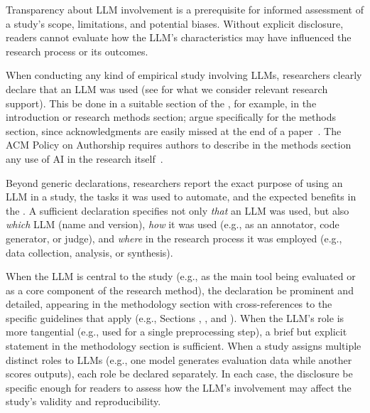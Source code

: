 
Transparency about LLM involvement is a prerequisite for informed assessment of a study's scope, limitations, and potential biases.
Without explicit disclosure, readers cannot evaluate how the LLM's characteristics may have influenced the research process or its outcomes.


When conducting any kind of empirical study involving LLMs, researchers \must clearly declare that an LLM was used (see \scope for what we consider relevant research support).
This \should be done in a suitable section of the \paper, for example, in the introduction or research methods section; \citeauthor{cheng2025writing} argue specifically for the methods section, since acknowledgments are easily missed at the end of a paper~\cite{cheng2025writing}.
The ACM Policy on Authorship requires authors to describe in the methods section any use of AI in the research itself~\cite{ACM2026}.

Beyond generic declarations, researchers \should report the exact purpose of using an LLM in a study, the tasks it was used to automate, and the expected benefits in the \paper.
A sufficient declaration specifies not only \emph{that} an LLM was used, but also \emph{which} LLM (name and version), \emph{how} it was used (e.g., as an annotator, code generator, or judge), and \emph{where} in the research process it was employed (e.g., data collection, analysis, or synthesis).

When the LLM is central to the study (e.g., as the main tool being evaluated or as a core component of the research method), the declaration \should be prominent and detailed, appearing in the methodology section with cross-references to the specific guidelines that apply (e.g., Sections \modelversion, \design, and \traces).
When the LLM's role is more tangential (e.g., used for a single preprocessing step), a brief but explicit statement in the methodology section is sufficient.
When a study assigns multiple distinct roles to LLMs (e.g., one model generates evaluation data while another scores outputs), each role \should be declared separately.
In each case, the disclosure \must be specific enough for readers to assess how the LLM's involvement may affect the study's validity and reproducibility.

